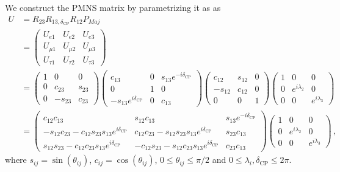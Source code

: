 We construct the PMNS matrix by parametrizing it as as
\begin{align}\label{PMNS_def}
    U &= R_{23}R_{13,\delta_{\text{CP}}}R_{12}P_{Maj} \nonumber \\
     &= \begin{pmatrix}
        U_{e 1} & U_{e2} & U_{e3} \\
         U_{\mu 1} & U_{\mu 2} & U_{\mu 3} \\
         U_{\tau 1} & U_{\tau 2} & U_{\tau 3}
      \end{pmatrix} \nonumber \\
      & = \begin{pmatrix}1 & 0 & 0 \\ 0 & c_{23} & s_{23} \\ 0 & -s_{23} & c_{23}\end{pmatrix}
\begin{pmatrix}c_{13} & 0 & s_{13} e^{-i \delta_{\mathrm{CP}}} \\ 0 & 1 & 0 \\ -s_{13} e^{i \delta_{\mathrm{CP}}} & 0 & c_{13}\end{pmatrix}
\begin{pmatrix}c_{12} & s_{12} & 0 \\ -s_{12} & c_{12} & 0 \\ 0 & 0 & 1\end{pmatrix}
\begin{pmatrix}1 & 0 & 0 \\ 0 & e^{i \lambda_{2}} & 0 \\ 0 & 0 & e^{i \lambda_{3}}\end{pmatrix}
\nonumber \\
 &=\begin{pmatrix}c_{12} c_{13} & s_{12} c_{13} & s_{13} e^{-i \delta_{\mathrm{CP}}} \\ 
        -s_{12} c_{23}-c_{12} s_{23} s_{13}e^{i \delta_{\mathrm{CP}}} & c_{12} c_{23}-s_{12} s_{23} s_{13}e^{i \delta_{\mathrm{CP}}} & s_{23} c_{13} \\ 
        s_{12} s_{23}-c_{12} c_{23} s_{13}e^{i \delta_{\mathrm{CP}}}  & -c_{12} s_{23}-s_{12} c_{23} s_{13}e^{i \delta_{\mathrm{CP}}} & c_{23} c_{13}
    \end{pmatrix}
    \begin{pmatrix}1 & 0 & 0 \\ 0 & e^{i \lambda_{2}} & 0 \\ 0 & 0 & e^{i \lambda_{3}}\end{pmatrix}\,,
\end{align}
where $s_{ij} = \sin(\theta_{ij})$, $c_{ij} = \cos(\theta_{ij})$, $0 \leq \theta_{ij} \leq \pi/2$ and $ 0 \leq \lambda_{i},\delta_\mathrm{CP} \leq 2\pi$. 

